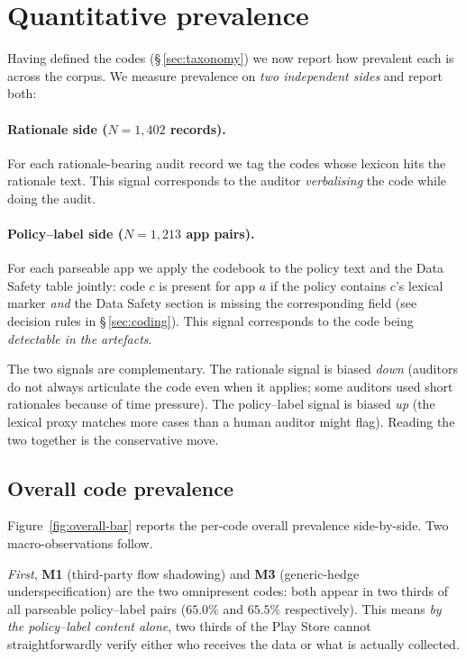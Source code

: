 \documentclass[11pt,a4paper]{article}
\newcommand{\code}[1]{\textsf{\textbf{#1}}}
\begin{document}
\section{Quantitative prevalence}\label{sec:prev}

Having defined the codes (\S\,\ref{sec:taxonomy}) we now report how
prevalent each is across the corpus. We measure prevalence on
\emph{two independent sides} and report both:

\paragraph{Rationale side ($N=1{,}402$ records).} For each
rationale-bearing audit record we tag the codes whose lexicon hits
the rationale text. This signal corresponds to the auditor
\emph{verbalising} the code while doing the audit.

\paragraph{Policy--label side ($N=1{,}213$ app pairs).} For each
parseable app we apply the codebook to the policy text and the
Data Safety table jointly: code $c$ is present for app $a$ if the
policy contains $c$'s lexical marker \emph{and} the Data Safety
section is missing the corresponding field (see decision rules in
\S\,\ref{sec:coding}). This signal corresponds to the code
being \emph{detectable in the artefacts}.

The two signals are complementary. The rationale signal is biased
\emph{down} (auditors do not always articulate the code even when it
applies; some auditors used short rationales because of time
pressure). The policy--label signal is biased \emph{up} (the lexical
proxy matches more cases than a human auditor might flag). Reading
the two together is the conservative move.

\subsection{Overall code prevalence}
Figure~\ref{fig:overall-bar} reports the per-code overall prevalence
side-by-side. Two macro-observations follow.

\emph{First}, \code{M1} (third-party flow shadowing) and \code{M3}
(generic-hedge underspecification) are the two omnipresent codes:
both appear in two thirds of all parseable policy--label pairs
($65.0\%$ and $65.5\%$ respectively). This means \emph{by the
policy--label content alone}, two thirds of the Play Store cannot
straightforwardly verify either who receives the data or what is
actually collected.
\end{document}
